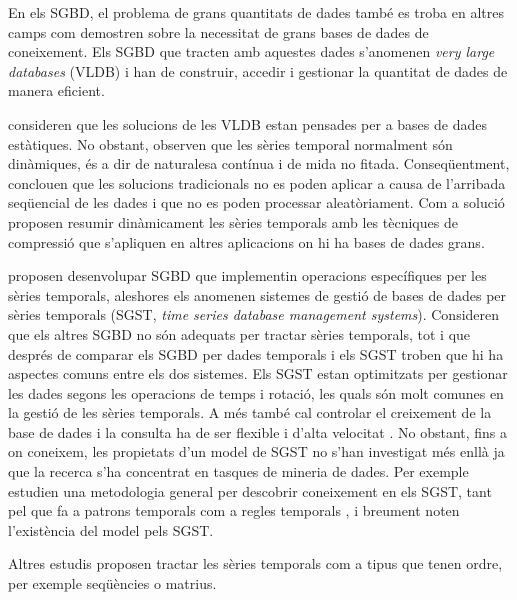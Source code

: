  
En els SGBD, el problema de grans quantitats de dades també es troba en altres camps com demostren \textcite{mylopoulos96} sobre la necessitat de grans bases de dades de coneixement. Els SGBD que tracten amb aquestes dades s'anomenen \emph{very large databases} (VLDB) i han de construir, accedir i gestionar la quantitat de dades de manera eficient.

\textcite{ogras06}  consideren que les solucions de les VLDB estan pensades per a bases de dades estàtiques. No obstant, observen que les sèries temporal normalment són dinàmiques, és a dir de naturalesa contínua i de mida no fitada. Conseqüentment, conclouen que les solucions tradicionals no es poden aplicar a causa de l'arribada seqüencial de les dades i que no es poden processar aleatòriament. 
Com a solució proposen resumir dinàmicament les sèries temporals amb les tècniques de compressió que s'apliquen en altres aplicacions on hi ha bases de dades grans.




\textcite{dreyer94} proposen desenvolupar SGBD que implementin operacions específiques per les sèries temporals, aleshores els anomenen sistemes de gestió de bases de dades per sèries temporals (SGST, \emph{time series database management systems}). Consideren que els altres SGBD no són adequats per tractar sèries temporals, tot i que després de comparar els SGBD per dades temporals i els SGST \parencite{schmidt95} troben que hi ha aspectes comuns entre els dos sistemes.
Els SGST estan optimitzats per gestionar les dades segons les operacions de temps i rotació, les quals són molt comunes en la gestió de les sèries temporals.  A més també cal controlar el creixement de la base de dades i la consulta ha de ser flexible i d'alta velocitat \parencite{keogh10:isax}. 
No obstant, fins a on coneixem, les propietats d'un model de SGST no s'han investigat més enllà  ja que la recerca s'ha concentrat en tasques de mineria de dades. Per exemple \textcite{last01} estudien una metodologia general per descobrir coneixement en els SGST, tant pel que fa a 
patrons temporals %
com a regles temporals%
, i breument noten l'existència del model \cite{dreyer94} pels SGST.


Altres estudis proposen tractar les sèries temporals com a tipus que tenen ordre, per exemple seqüències o matrius.


